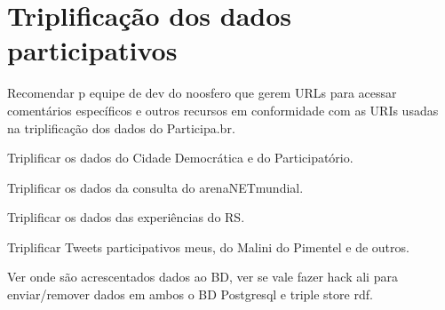\documentclass[12pt]{report}
\begin{document}
\chapter{Triplificação dos dados participativos}
Recomendar p equipe de dev do noosfero que gerem URLs para acessar comentários específicos e outros recursos em conformidade com as URIs usadas na triplificação dos dados do Participa.br.

Triplificar os dados do Cidade Democrática e do Participatório.

Triplificar os dados da consulta do arenaNETmundial.

Triplificar os dados das experiências do RS.

Triplificar Tweets participativos meus, do Malini do Pimentel e de outros.

Ver onde são acrescentados dados ao BD, ver se vale fazer hack ali para enviar/remover dados em ambos o BD Postgresql e triple store rdf.
\end{document}
